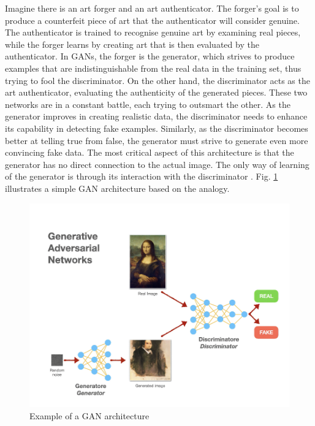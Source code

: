 Imagine there is an art forger and an art authenticator. The forger's goal is to produce a counterfeit piece of art that the authenticator will consider genuine. The authenticator is trained to recognise genuine art by examining real pieces, while the forger learns by creating art that is then evaluated by the authenticator. In GANs, the forger is the generator, which strives to produce examples that are indistinguishable from the real data in the training set, thus trying to fool the discriminator. On the other hand, the discriminator acts as the art authenticator, evaluating the authenticity of the generated pieces. These two networks are in a constant battle, each trying to outsmart the other. As the generator improves in creating realistic data, the discriminator needs to enhance its capability in detecting fake examples. Similarly, as the discriminator becomes better at telling true from false, the generator must strive to generate even more convincing fake data. The most critical aspect of this architecture is that the generator has no direct connection to the actual image. The only way of learning of the generator is through its interaction with the discriminator \cite{GeneratingNewRealityBook}. Fig. \ref{fig:GAN architecture} illustrates a simple GAN architecture based on the analogy.
\begin{figure}[h!]
\centering
  \includegraphics[scale=0.5]{figures/GANs-ex-art.png}
  \caption{Example of a GAN architecture}
  \label{fig:GAN architecture}
\end{figure}


